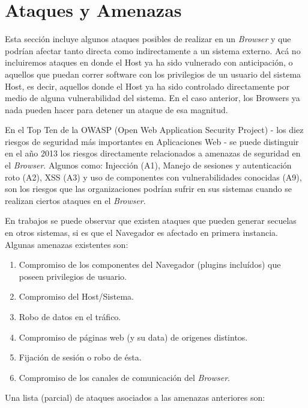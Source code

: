 \section{Ataques y Amenazas}
Esta sección incluye algunos ataques posibles de realizar en un \textit{Browser} y que podrían afectar tanto directa como indirectamente a un sistema externo. Acá no incluiremos ataques en donde el Host ya ha sido vulnerado con anticipación, o aquellos que puedan correr software con los privilegios de un usuario del sistema Host, es decir, aquellos donde el Host ya ha sido controlado directamente por medio de alguna vulnerabilidad del sistema. En el caso anterior, los Browsers ya nada pueden hacer para detener un ataque de esa magnitud.

En el Top Ten \cite{owaspTopTen} de la OWASP (Open Web Application Security Project) - los diez riesgos de seguridad más importantes en Aplicaciones Web - se puede distinguir en el año 2013 los riesgos directamente relacionados a amenazas de seguridad en el \textit{Browser}. Algunos como: Injección (A1), Manejo de sesiones y autenticación roto (A2), XSS (A3) y uso de componentes con vulnerabilidades conocidas (A9), son los riesgos que las organizaciones podrían sufrir en sus sistemas cuando se realizan ciertos ataques en el \textit{Browser}.

En trabajos \cite{barth2008security, FirefoxThreatModel} se puede observar que existen ataques que pueden generar secuelas en otros sistemas, si es que el Navegador es afectado en primera instancia. Algunas amenazas existentes son:

\begin{enumerate}
	\item Compromiso de los componentes del Navegador (plugins incluídos) que poseen privilegios de usuario.
	\item Compromiso del Host/Sistema.
	\item Robo de datos en el tráfico.
	\item Compromiso de páginas web (y su data) de origenes distintos.
	\item Fijación de sesión o robo de ésta.
	\item Compromiso de los canales de comunicación del \textit{Browser}.
\end{enumerate}

Una lista (parcial) de ataques asociados a las amenazas anteriores son:


